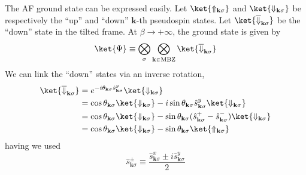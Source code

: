 The AF ground state can be expressed easily. Let $\ket{\Uparrow_{\mathbf{k}\sigma}}$ and $\ket{\Downarrow_{\mathbf{k}\sigma}}$ be respectively the ``up'' and ``down'' $\mathbf{k}$-th pseudospin states. Let $\ket{\overline{\Downarrow}_{\mathbf{k}\sigma}}$ be the ``down'' state in the tilted frame. At $\beta \to +\infty$, the ground state is given by
\begin{equation}\label{appeq:af-hm-gs-1}
	\ket{\Psi} \equiv \bigotimes_\sigma \bigotimes_{\mathbf{k}\in\mathrm{MBZ}} \ket{\overline{\Downarrow}_{\mathbf{k}\sigma}}
\end{equation}
We can link the ``down'' states via an inverse rotation,
\begin{align}
	\ket{\overline{\Downarrow}_{\mathbf{k}\sigma}} &= e^{-i\theta_{\mathbf{k}\sigma} \hat s_{\mathbf{k}\sigma}^y} \ket{\Downarrow_{\mathbf{k}\sigma}} \nonumber \\
	&= \cos \theta_{\mathbf{k}\sigma} \ket{\Downarrow_{\mathbf{k}\sigma}} - i \sin\theta_{\mathbf{k}\sigma} \hat s_{\mathbf{k}\sigma}^y \ket{\Downarrow_{\mathbf{k}\sigma}} \nonumber \\
	&= \cos \theta_{\mathbf{k}\sigma} \ket{\Downarrow_{\mathbf{k}\sigma}} - \sin\theta_{\mathbf{k}\sigma} (\hat s_{\mathbf{k}\sigma}^+ - \hat s_{\mathbf{k}\sigma}^-) \ket{\Downarrow_{\mathbf{k}\sigma}} \nonumber \\
	&= \cos \theta_{\mathbf{k}\sigma} \ket{\Downarrow_{\mathbf{k}\sigma}} - \sin\theta_{\mathbf{k}\sigma} \ket{\Uparrow_{\mathbf{k}\sigma}} \label{appeq:af-tilted-down}
\end{align}
having we used
\[
	\hat s_{\mathbf{k}\sigma}^\pm \equiv \frac{\hat s_{\mathbf{k}\sigma}^x \pm i\hat s_{\mathbf{k}\sigma}^y}{2}
\]

